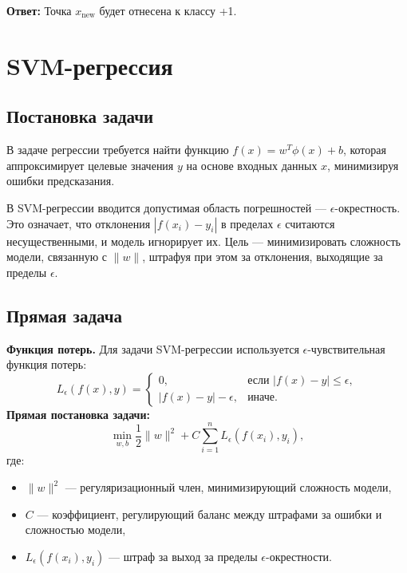 \textbf{Ответ:} Точка \(x_{\text{new}}\) будет отнесена к классу +1.

\section{SVM-регрессия}
\subsection{Постановка задачи}
\par В задаче регрессии требуется найти функцию \( f(x) = w^T \phi(x) + b \), которая аппроксимирует целевые значения \( y \) на основе входных данных \( x \), минимизируя ошибки предсказания.
\par В SVM-регрессии вводится допустимая область погрешностей — \(\epsilon\)-окрестность. Это означает, что отклонения \( |f(x_i) - y_i| \) в пределах \(\epsilon\) считаются несущественными, и модель игнорирует их. Цель — минимизировать сложность модели, связанную с \(\|w\|\), штрафуя при этом за отклонения, выходящие за пределы \(\epsilon\).

\subsection{Прямая задача}
\par\textbf{Функция потерь.}
Для задачи SVM-регрессии используется \(\epsilon\)-чувствительная функция потерь:
\begin{equation*}
    L_\epsilon(f(x), y) =
    \begin{cases}
        0,                     & \text{если } |f(x) - y| \leq \epsilon, \\
        |f(x) - y| - \epsilon, & \text{иначе.}
    \end{cases}
\end{equation*}
\noindent\textbf{Прямая постановка задачи:}
\begin{equation*}
    \min_{w, b} \frac{1}{2} \|w\|^2 + C \sum_{i=1}^n L_\epsilon(f(x_i), y_i),
\end{equation*}
где:
\begin{itemize}
    \item \(\|w\|^2\) — регуляризационный член, минимизирующий сложность модели,
    \item \(C\) — коэффициент, регулирующий баланс между штрафами за ошибки и сложностью модели,
    \item \(L_\epsilon(f(x_i), y_i)\) — штраф за выход за пределы \(\epsilon\)-окрестности.
\end{itemize}

